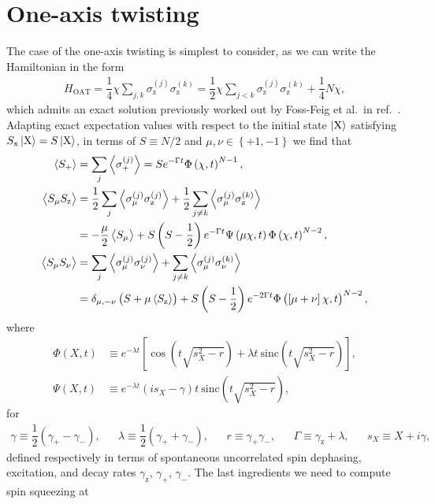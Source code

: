 \documentclass[aps,notitlepage,nofootinbib,11pt]{revtex4-1}
\renewcommand{\t}{\text} %
\newcommand{\f}[2]{\dfrac{#1}{#2}} %
\newcommand{\p}[1]{\left(#1\right)} %
\renewcommand{\sp}[1]{\left[#1\right]} %
\renewcommand{\set}[1]{\left\{#1\right\}} %
\newcommand{\bk}{\Braket} %
\newcommand{\z}{\text{z}}
\newcommand{\x}{\text{x}}
\newcommand{\X}{\text{X}}
\newcommand{\1}{\mathds{1}}
\begin{document}
\section{One-axis twisting}

The case of the one-axis twisting is simplest to consider, as we can
write the Hamiltonian in the form
\begin{align}
  H_{\t{OAT}} = \f14 \chi \sum_{j,k} \sigma_\z^{(j)} \sigma_\z^{(k)}
  = \f12 \chi \sum_{j<k} \sigma_\z^{(j)} \sigma_\z^{(k)} + \f14 N \chi,
\end{align}
which admits an exact solution previously worked out by Foss-Feig et
al.~in ref.~\cite{foss-feig2013nonequilibrium}.  Adapting exact
expectation values with respect to the initial state $\ket{\X}$
satisfying $S_\x\ket{\X}=S\ket{\X}$, in terms of $S\equiv N/2$ and
$\mu,\nu\in\set{+1,-1}$ we find that
\begin{align}
  \bk{S_+}
  &= \sum_j\bk{\sigma_+^{(j)}}
  = S e^{-\Gamma t} \Phi\p{\chi,t}^{N-1}, \label{eq:S+_OAT} \\
  \bk{S_\mu S_\z}
  &= \f12\sum_j\bk{\sigma_\mu^{(j)}\sigma_\z^{(j)}}
  + \f12\sum_{j\ne k} \bk{\sigma_\mu^{(j)} \sigma_\z^{(k)}} \\
  &= -\f{\mu}{2}\bk{S_\mu} + S \p{S-\f12} e^{-\Gamma t}
  \Psi\p{\mu\chi,t} \Phi\p{\chi,t}^{N-2}, \\
  \bk{S_\mu S_\nu}
  &= \sum_j \bk{\sigma_\mu^{(j)} \sigma_\nu^{(j)}}
  + \sum_{j\ne k} \bk{\sigma_\mu^{(j)} \sigma_\nu^{(k)}} \\
  &= \delta_{\mu,-\nu} \p{S + \mu\bk{S_\z}}
  + S \p{S-\f12} e^{-2\Gamma t}
  \Phi\p{\sp{\mu+\nu}\chi,t}^{N-2}, \label{eq:SS+-_OAT}
\end{align}
where
\begin{align}
  \Phi\p{X,t}
  &\equiv e^{-\lambda t} \sp{\cos\p{t\sqrt{s_X^2-r}}
    + \lambda t~\t{sinc}\p{t\sqrt{s_X^2-r}}},
  \\
  \Psi\p{X,t}
  &\equiv e^{-\lambda t} \p{is_X-\gamma}t~
  \t{sinc}\p{t\sqrt{s_X^2-r}},
\end{align}
for
\begin{align}
  \gamma \equiv \f12 \p{\gamma_+ - \gamma_-},
  &&
  \lambda \equiv \f12 \p{\gamma_+ + \gamma_-},
  &&
  r \equiv \gamma_+ \gamma_-,
  &&
  \Gamma \equiv \gamma_\z + \lambda,
  &&
  s_X \equiv X + i\gamma,
\end{align}
defined respectively in terms of spontaneous uncorrelated spin
dephasing, excitation, and decay rates $\gamma_\z$, $\gamma_+$,
$\gamma_-$.  The last ingredients we need to compute spin squeezing at
\end{document}
